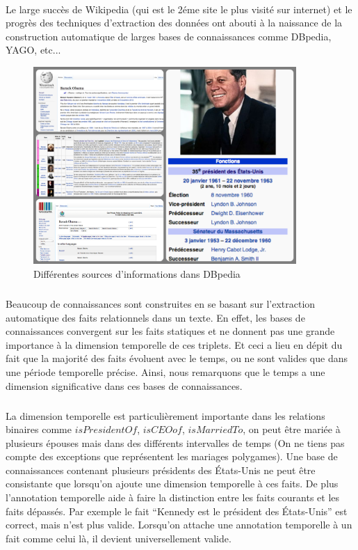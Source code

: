 \documentclass[12pt,a4	]{report}
\begin{document}
\paragraph{}
Le large succès de Wikipedia (qui est le 2éme site le plus visité sur internet) et le progrès des techniques d’extraction des données ont abouti à la naissance de la construction automatique  de larges bases de connaissances comme DBpedia, YAGO, etc...
\begin{figure}[H]
\centering
\includegraphics[width=10cm]{Sources.png}
\caption{Différentes sources d'informations dans DBpedia}
\end{figure}
\subparagraph{}
Beaucoup de connaissances sont construites en se basant sur l’extraction automatique des faits relationnels dans un texte.
En effet, les bases de connaissances convergent sur les faits statiques et ne donnent pas une grande importance à la dimension temporelle de ces triplets.
Et ceci a lieu en dépit du fait que la majorité des faits évoluent avec le temps, ou ne sont valides que dans une période temporelle précise. Ainsi, nous remarquons que le temps a une dimension significative dans ces bases de connaissances.
\subparagraph{}
La dimension temporelle est particulièrement importante dans les relations binaires comme $isPresidentOf$, $isCEOof$, $isMarriedTo$, on peut être mariée à plusieurs épouses mais dans des différents intervalles de temps (On ne tiens pas compte des exceptions que représentent les mariages polygames).
Une base de connaissances contenant plusieurs présidents des États-Unis ne peut être consistante que lorsqu’on ajoute une dimension temporelle à ces faits. De plus l’annotation temporelle aide à faire la distinction entre les faits courants et les faits dépassés.
Par exemple le fait ``Kennedy est le président des États-Unis'' est correct, mais n'est plus valide.
Lorsqu’on attache une annotation temporelle à un fait comme celui là, il devient universellement valide.
\end{document}
